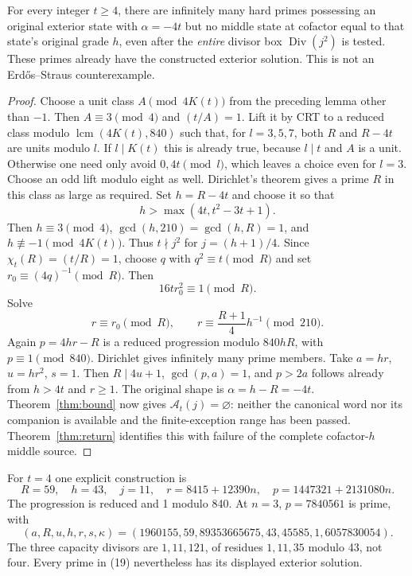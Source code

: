 \begin{theorem}\label{thm:obstruct}
For every integer $t\ge4$, there are infinitely many hard primes possessing an
original exterior state with $\alpha=-4t$ but no middle state at cofactor equal
to that state's original grade $h$, even after the \emph{entire} divisor box
$\operatorname{Div}(j^2)$ is tested. These primes already have the constructed
exterior solution. This is not an Erd\H{o}s--Straus counterexample.
\end{theorem}
\begin{proof}
Choose a unit class $A\pmod{4K(t)}$ from the preceding lemma other than $-1$.
Then $A\equiv3\pmod4$ and $(t/A)=1$. Lift it by CRT to a reduced class modulo
$\operatorname{lcm}(4K(t),840)$ such that, for $l=3,5,7$, both $R$ and
$R-4t$ are units modulo $l$. If $l\mid K(t)$ this is already true, because
$l\mid t$ and $A$ is a unit. Otherwise one need only avoid $0,4t\pmod l$,
which leaves a choice even for $l=3$. Choose an odd lift modulo eight as well.
Dirichlet's theorem gives a prime $R$ in this class as large as required.
Set $h=R-4t$ and choose it so that
\[
 h>\max(4t,t^2-3t+1).
\]
Then $h\equiv3\pmod4$, $\gcd(h,210)=\gcd(h,R)=1$, and
$h\not\equiv-1\pmod{4K(t)}$. Thus $t\nmid j^2$ for $j=(h+1)/4$.
   Since \(\chi_t(R)=(t/R)=1\), choose \(q\) with \(q^2\equiv t\pmod R\)
   and set \(r_0\equiv(4q)^{-1}\pmod R\).  Then
\[
 16tr_0^2\equiv1\pmod R.
 \]
 Solve
\[
 r\equiv r_0\pmod R,\qquad
 r\equiv\frac{R+1}{4}h^{-1}\pmod{210}.
\]
Again $p=4hr-R$ is a reduced progression modulo $840hR$, with $p\equiv1\pmod{840}$.
Dirichlet gives infinitely many prime members. Take $a=hr$, $u=hr^2$, $s=1$.
Then $R\mid4u+1$, $\gcd(p,a)=1$, and $p>2a$ follows already from $h>4t$ and
$r\ge1$. The original shape is $\alpha=h-R=-4t$.
Theorem~\ref{thm:bound} now gives $\mathcal A_t(j)=\varnothing$: neither the
canonical word nor its companion is available and the finite-exception range
has been passed. Theorem~\ref{thm:return} identifies this with failure of the
complete cofactor-$h$ middle source.
\end{proof}

For $t=4$ one explicit construction is
\[
 R=59,\quad h=43,\quad j=11,\quad
 r=8415+12390n,\quad
 \boxed{p=1447321+2131080n.}                              \tag{19}
\]
The progression is reduced and 1 modulo 840. At $n=3$, $p=7840561$ is prime,
with
\[
 (a,R,u,h,r,s,\kappa)
 =(1960155,59,89353665675,43,45585,1,6057830054).
\]
The three capacity divisors are $1,11,121$, of residues $1,11,35$ modulo 43,
not four. Every prime in (19) nevertheless has its displayed exterior solution.


